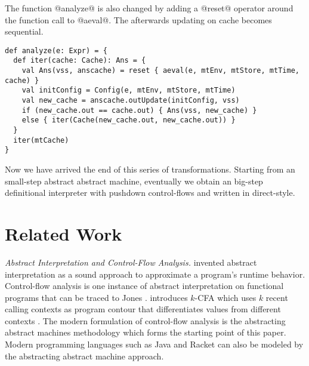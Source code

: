 \documentclass[acmsmall]{acmart}\settopmatter{}
\begin{document}
The function @analyze@ is also changed by adding a @reset@ operator around the function 
call to @aeval@. The afterwards updating on cache becomes sequential.

\begin{lstlisting}
def analyze(e: Expr) = {
  def iter(cache: Cache): Ans = {
    val Ans(vss, anscache) = reset { aeval(e, mtEnv, mtStore, mtTime, cache) }
    val initConfig = Config(e, mtEnv, mtStore, mtTime) 
    val new_cache = anscache.outUpdate(initConfig, vss)
    if (new_cache.out == cache.out) { Ans(vss, new_cache) }
    else { iter(Cache(new_cache.out, new_cache.out)) }
  }
  iter(mtCache)
}
\end{lstlisting}

Now we have arrived the end of this series of transformations. Starting from an 
small-step abstract abstract machine,  eventually we obtain an big-step definitional
interpreter with pushdown control-flows and written in direct-style.


\section{Related Work}\label{sec:related}

\textit{Abstract Interpretation and Control-Flow Analysis.}
\citeauthor{cousot1977abstract} invented abstract interpretation as a sound approach
to approximate a program's runtime behavior\cite{cousot1977abstract}.
Control-flow analysis is one instance of abstract interpretation on functional programs
that can be traced to Jones \cite{jones1981flow}.
\citeauthor{Shivers:1988:CFA:53990.54007} introduces $k$-CFA which uses $k$ recent calling
contexts as program contour that differentiates values from different contexts 
\cite{Shivers:1988:CFA:53990.54007, Shivers:1991:SSC:115865.115884}.
The modern formulation of control-flow analysis is the abstracting abstract machines
methodology \cite{van2012systematic, van2010abstracting} which forms the starting point
of this paper.
Modern programming languages such as Java\cite{might2010resolving} and Racket 
\cite{Tobin-Hochstadt:2012:HSE:2384616.2384655}
can also be modeled by the abstracting abstract machine approach. \\
\end{document}
